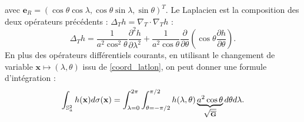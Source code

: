 avec $\mathbf{e}_{R} = \left( \cos \theta \cos \lambda, \cos \theta \sin \lambda, \sin \theta \right)^T$. Le Laplacien est la composition des deux opérateurs précédents : $\Delta_T h = \nabla_T \cdot \nabla_T h$ :
\begin{equation}\label{laplacien_lonlat}
\Delta_T h = \dfrac{1}{a^2 \cos^2 \theta} \dfrac{\partial^2 h }{\partial \lambda^2} + \dfrac{1}{a^2 \cos \theta} \dfrac{\partial}{\partial \theta} \left( \cos \theta \dfrac{\partial h}{\partial \theta} \right).
\end{equation}
En plus des opérateurs différentiels courants, en utilisant le changement de variable $\mathbf{x} \mapsto (\lambda, \theta)$ issu de \eqref{coord_latlon}, on peut donner une formule d'intégration :
\begin{equation}\label{integrale_lonlat}
\displaystyle\int_{\mathbb{S}_a^2} h(\mathbf{x})d\sigma(\mathbf{x})= \displaystyle\int_{\lambda=0}^{2 \pi} \displaystyle\int_{\theta = - \pi/2}^{\pi/2} h(\lambda, \theta) \underbrace{a^2 \cos \theta}_{\sqrt{\overline{\mathbf{G}}}} d \theta d \lambda.
\end{equation}
